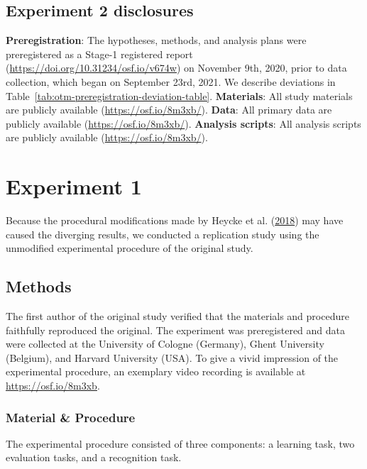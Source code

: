 \documentclass[
  man,floatsintext]{apa6}
\begin{document}
\hypertarget{experiment-2-disclosures}{%
\subsection{Experiment 2 disclosures}\label{experiment-2-disclosures}}

\textbf{Preregistration}: The hypotheses, methods, and analysis plans were preregistered as a Stage-1 registered report (\url{https://doi.org/10.31234/osf.io/v674w}) on November 9th, 2020, prior to data collection, which began on September 23rd, 2021. We describe deviations in Table~\ref{tab:otm-preregistration-deviation-table}.
\textbf{Materials}: All study materials are publicly available (\url{https://osf.io/8m3xb/}).
\textbf{Data}: All primary data are publicly available (\url{https://osf.io/8m3xb/}).
\textbf{Analysis scripts}: All analysis scripts are publicly available (\url{https://osf.io/8m3xb/}).

\hypertarget{experiment-1}{%
\section{Experiment 1}\label{experiment-1}}

Because the procedural modifications made by Heycke et al. (\protect\hyperlink{ref-heycke_two_2018}{2018}) may have caused the diverging results, we conducted a replication study using the unmodified experimental procedure of the original study.

\hypertarget{methods}{%
\subsection{Methods}\label{methods}}

The first author of the original study verified that the materials and procedure faithfully reproduced the original.
The experiment was preregistered and data were collected at the University of Cologne (Germany), Ghent University (Belgium), and Harvard University (USA).
To give a vivid impression of the experimental procedure, an exemplary video recording is available at \url{https://osf.io/8m3xb}.

\hypertarget{material-procedure}{%
\subsubsection{Material \& Procedure}\label{material-procedure}}

The experimental procedure consisted of three components: a learning task, two evaluation tasks, and a recognition task.
\end{document}
